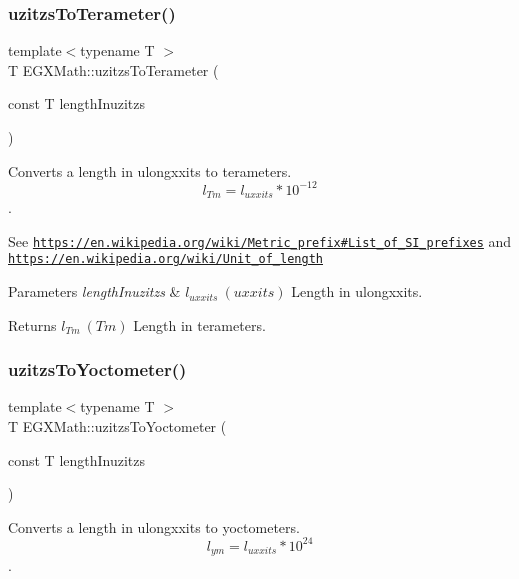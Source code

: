 \subsubsection{\texorpdfstring{uzitzs\+To\+Terameter()}{uzitzsToTerameter()}}
{\footnotesize\ttfamily template$<$typename T $>$ \\
T E\+G\+X\+Math\+::uzitzs\+To\+Terameter (\begin{DoxyParamCaption}\item[{const T}]{length\+Inuzitzs }\end{DoxyParamCaption})}



Converts a length in ulongxxits to terameters. \[ l_{Tm}=l_{uxxits} * 10^{-12} \]. 

See \href{https://en.wikipedia.org/wiki/Metric_prefix#List_of_SI_prefixes}{\tt https\+://en.\+wikipedia.\+org/wiki/\+Metric\+\_\+prefix\#\+List\+\_\+of\+\_\+\+S\+I\+\_\+prefixes} and \href{https://en.wikipedia.org/wiki/Unit_of_length}{\tt https\+://en.\+wikipedia.\+org/wiki/\+Unit\+\_\+of\+\_\+length} 
\begin{DoxyParams}{Parameters}
{\em length\+Inuzitzs} & $ l_{uxxits}\ (uxxits)$ Length in ulongxxits. \\
\hline
\end{DoxyParams}
\begin{DoxyReturn}{Returns}
$ l_{Tm}\ (Tm)$ Length in terameters. 
\end{DoxyReturn}
\mbox{\label{group___e_g_x_math-_conversions-_length_conversions-_non-_s_i-uzitzs-_s_i_gae0faf7639d852bfde8863b3615aa096a}} 
\subsubsection{\texorpdfstring{uzitzs\+To\+Yoctometer()}{uzitzsToYoctometer()}}
{\footnotesize\ttfamily template$<$typename T $>$ \\
T E\+G\+X\+Math\+::uzitzs\+To\+Yoctometer (\begin{DoxyParamCaption}\item[{const T}]{length\+Inuzitzs }\end{DoxyParamCaption})}



Converts a length in ulongxxits to yoctometers. \[ l_{ym}=l_{uxxits} * 10^{24} \]. 

